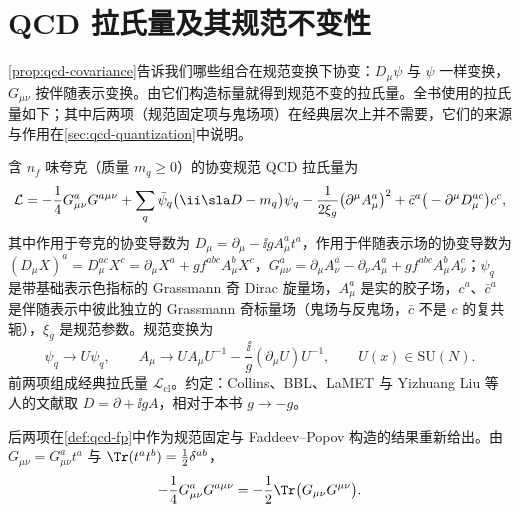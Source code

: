 \section{QCD 拉氏量及其规范不变性}\label{sec:prelim-qcd}

\cref{prop:qcd-covariance}告诉我们哪些组合在规范变换下协变：$D_\mu\psi$ 与 $\psi$ 一样变换，$G_{\mu\nu}$ 按伴随表示变换。由它们构造标量就得到规范不变的拉氏量。全书使用的拉氏量如下；其中后两项（规范固定项与鬼场项）在经典层次上并不需要，它们的来源与作用在\cref{sec:qcd-quantization}中说明。

\begin{definition}\label{def:prelim-qcd}
含 $n_f$ 味夸克（质量 $m_q\ge0$）的协变规范 QCD 拉氏量为 %
\begin{equation}\label{eq:qcd-lagrangian}
\mathcal L=-\frac14G^a_{\mu\nu}G^{a\mu\nu}+\sum_q\bar\psi_q\big(\ii\sla D-m_q\big)\psi_q-\frac1{2\xi_g}\big(\partial^\mu A^a_\mu\big)^2+\bar c^a\big(-\partial^\mu D^{ac}_\mu\big)c^c ,
\end{equation}
其中作用于夸克的协变导数为 $D_\mu=\partial_\mu-\ii gA^a_\mu t^a$，作用于伴随表示场的协变导数为 $(D_\mu X)^a=D^{ac}_\mu X^c=\partial_\mu X^a+gf^{abc}A^b_\mu X^c$，$G^a_{\mu\nu}=\partial_\mu A^a_\nu-\partial_\nu A^a_\mu+gf^{abc}A^b_\mu A^c_\nu$；$\psi_q$ 是带基础表示色指标的 Grassmann 奇 Dirac 旋量场，$A^a_\mu$ 是实的胶子场，$c^a$、$\bar c^a$ 是伴随表示中彼此独立的 Grassmann 奇标量场（鬼场与反鬼场，$\bar c$ 不是 $c$ 的复共轭），$\xi_g$ 是规范参数。规范变换为
\begin{equation}\label{eq:qcd-gauge-trafo}
\psi_q\to U\psi_q,\qquad A_\mu\to UA_\mu U^{-1}-\frac{\ii}g(\partial_\mu U)U^{-1},\qquad U(x)\in\mathrm{SU}(N).
\end{equation}
前两项组成经典拉氏量 $\mathcal L_{\mathrm{cl}}$。约定：Collins\cite{Collins2011}、BBL、LaMET 与 Yizhuang Liu 等人的文献取 $D=\partial+\ii gA$，相对于本书 $g\to-g$。
\end{definition}

后两项在\cref{def:qcd-fp}中作为规范固定与 Faddeev--Popov 构造的结果重新给出。由 $G_{\mu\nu}=G^a_{\mu\nu}t^a$ 与 $\Tr(t^at^b)=\frac12\delta^{ab}$，
\begin{equation}\label{eq:qcd-GG-trace}
-\frac14G^a_{\mu\nu}G^{a\mu\nu}=-\frac12\Tr\big(G_{\mu\nu}G^{\mu\nu}\big).
\end{equation}

